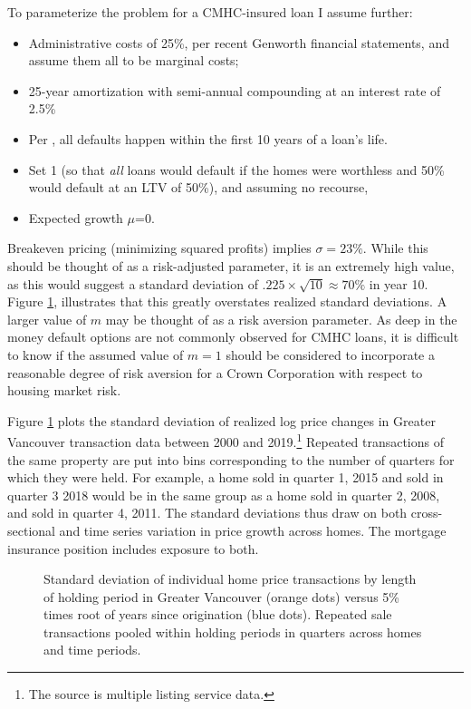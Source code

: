\documentclass[12pt]{article}
\begin{document}
To parameterize the problem for a CMHC-insured loan I assume further:
\begin{itemize}
	\item Administrative costs of 25\%, per recent Genworth financial statements, and assume them all to be marginal costs;
	\item 25-year amortization with semi-annual compounding at an interest rate of 2.5\%
	\item Per \textcite{SchwartzTorous}, all defaults happen within the first 10 years of a loan's life. 
	\item Set 1 (so that \emph{all} loans would default if the homes were worthless and 50\% would default at an LTV of 50\%), and assuming no recourse, 
	\item Expected growth $\mu$=0.
\end{itemize}

Breakeven pricing (minimizing squared profits) implies $\sigma=23\%.$ While
this should be thought of as a risk-adjusted parameter, it is an extremely high
value, as this would suggest a standard deviation of
$.225\times\sqrt{10}\approx 70\%$ in year 10. Figure \ref{fig:t_sd},
illustrates that this greatly overstates realized standard deviations. A larger
value of $m$ may be thought of as a risk aversion parameter. As deep in the
money default options are not commonly observed for CMHC loans, it is difficult
to know if the assumed value of $m=1$ should be considered to incorporate a
reasonable degree of risk aversion for a Crown Corporation with respect to
housing market risk.

Figure \ref{fig:t_sd} plots the standard deviation of realized log price
changes in Greater Vancouver transaction data between 2000 and
2019.\footnote{The source is multiple listing service data.} Repeated
transactions of the same property are put into bins corresponding to the number
of quarters for which they were held. For example, a home sold in quarter 1,
2015 and sold in quarter 3 2018 would be in the same group as a home sold in
quarter 2, 2008, and sold in quarter 4, 2011. The standard deviations thus draw
on both cross-sectional and time series variation in price growth across homes.
The mortgage insurance position includes exposure to both. 

\begin{figure}
	\caption{\label{fig:t_sd} Standard deviation of individual home price transactions by length of holding period in Greater Vancouver (orange dots) versus 5\% times root of years since origination (blue dots). Repeated sale transactions pooled within holding periods in quarters across homes and time periods.}
\end{figure}
\end{document}
